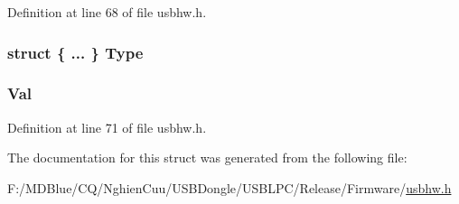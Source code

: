 Definition at line 68 of file usbhw.h.

\hypertarget{struct___u_s_b___d_m_a___d_e_s_c_r_i_p_t_o_r_a05d670c70cee2df071e2593f20a5397c}{
\subsubsection[{Type}]{\setlength{\rightskip}{0pt plus 5cm}struct \{ ... \}   {\bf Type}}}
\label{struct___u_s_b___d_m_a___d_e_s_c_r_i_p_t_o_r_a05d670c70cee2df071e2593f20a5397c}
\hypertarget{struct___u_s_b___d_m_a___d_e_s_c_r_i_p_t_o_r_a1a2aefd22f32fe19c7a40fd62958b591}{
\subsubsection[{Val}]{ {\bf Val}}}
\label{struct___u_s_b___d_m_a___d_e_s_c_r_i_p_t_o_r_a1a2aefd22f32fe19c7a40fd62958b591}


Definition at line 71 of file usbhw.h.



The documentation for this struct was generated from the following file:\begin{DoxyCompactItemize}
\item 
F:/MDBlue/CQ/NghienCuu/USBDongle/USBLPC/Release/Firmware/\hyperlink{usbhw_8h}{usbhw.h}\end{DoxyCompactItemize}
